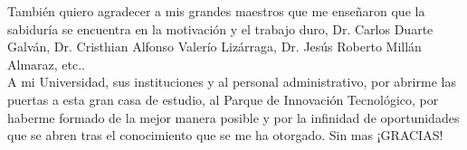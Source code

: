 
\begin{acknowledgements}

También quiero agradecer a mis grandes maestros que me enseñaron que la sabiduría se encuentra en la motivación y el trabajo duro, Dr. Carlos Duarte Galván, Dr. Cristhian Alfonso Valerío Lizárraga, Dr. Jesús Roberto Millán Almaraz, etc..\\
A mi Universidad, sus instituciones y al personal administrativo, por abrirme las puertas a esta gran casa de estudio, al Parque de Innovación Tecnológico, por haberme formado de la mejor manera posible y por la infinidad de oportunidades que se abren tras el conocimiento que se me ha otorgado. Sin mas ¡GRACIAS!
\end{acknowledgements}




